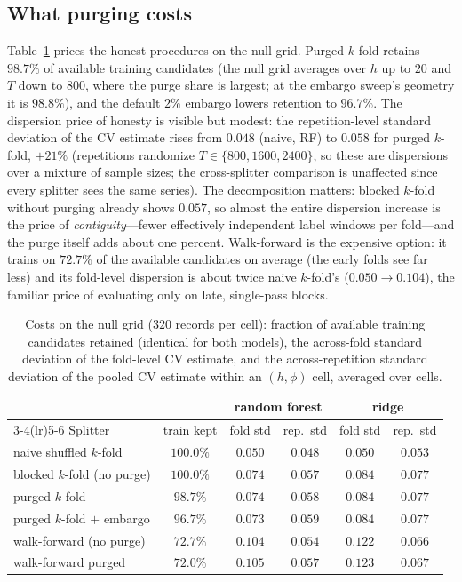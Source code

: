 \documentclass[11pt]{article}
\begin{document}
\subsection{What purging costs}
\label{sec:costs}

Table~\ref{tab:costs} prices the honest procedures on the null grid. Purged
$k$-fold retains $98.7\%$ of available training candidates (the null grid
averages over $h$ up to $20$ and $T$ down to $800$, where the purge share is
largest; at the embargo sweep's geometry it is $98.8\%$), and the default
$2\%$ embargo lowers retention to $96.7\%$. The dispersion price of honesty
is visible but modest: the repetition-level standard deviation of the CV
estimate rises from $0.048$ (naive, RF) to $0.058$ for purged $k$-fold,
$+21\%$ (repetitions randomize $T \in \{800, 1600, 2400\}$, so these are
dispersions over a mixture of sample sizes; the cross-splitter comparison is
unaffected since every splitter sees the same series). The decomposition
matters: blocked $k$-fold without purging already
shows $0.057$, so almost the entire dispersion increase is the price of
\emph{contiguity}---fewer effectively independent label windows per
fold---and the purge itself adds about one percent. Walk-forward is the
expensive option: it trains on $72.7\%$ of the available candidates on
average (the early folds see far less) and its fold-level dispersion is
about twice naive $k$-fold's ($0.050 \to 0.104$), the familiar price of
evaluating only on late, single-pass blocks.

\begin{table}[t]
\centering
\caption{Costs on the null grid ($320$ records per cell): fraction of
available training candidates retained (identical for both models), the
across-fold standard deviation of the fold-level CV estimate, and the
across-repetition standard deviation of the pooled CV estimate within an
$(h,\phi)$ cell, averaged over cells.}
\label{tab:costs}
\small
\begin{tabular}{lc@{\hskip 1.8em}cc@{\hskip 1.8em}cc}
\toprule
& & \multicolumn{2}{c}{random forest} & \multicolumn{2}{c}{ridge}\\
\cmidrule(lr){3-4}\cmidrule(lr){5-6}
Splitter & train kept & fold std & rep.\ std & fold std & rep.\ std \\
\midrule
naive shuffled $k$-fold       & $100.0\%$ & $0.050$ & $0.048$ & $0.050$ & $0.053$ \\
blocked $k$-fold (no purge)   & $100.0\%$ & $0.074$ & $0.057$ & $0.084$ & $0.077$ \\
purged $k$-fold               & $98.7\%$  & $0.074$ & $0.058$ & $0.084$ & $0.077$ \\
purged $k$-fold $+$ embargo   & $96.7\%$  & $0.073$ & $0.059$ & $0.084$ & $0.077$ \\
walk-forward (no purge)       & $72.7\%$  & $0.104$ & $0.054$ & $0.122$ & $0.066$ \\
walk-forward purged           & $72.0\%$  & $0.105$ & $0.057$ & $0.123$ & $0.067$ \\
\bottomrule
\end{tabular}
\end{table}
\end{document}
